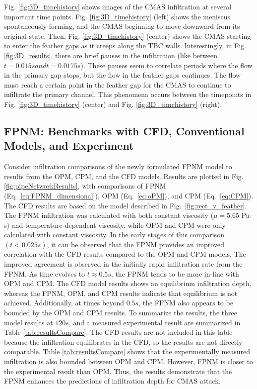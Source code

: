 \documentclass{UCF_ETD}
\begin{document}
Fig. \ref{fig:3D_timehistory} shows images of the CMAS infiltration at several important time points. Fig. \ref{fig:3D_timehistory} (left) shows the meniscus spontaneously forming, and the CMAS beginning to move downward from its original state. Then, Fig. \ref{fig:3D_timehistory} (center) shows the CMAS starting to enter the feather gaps as it creeps along the TBC walls. Interestingly, in Fig. \ref{fig:3D_results}, there are brief pauses in the infiltration (like between $t=0.015 s and t=0.0175 s$). These pauses seem to correlate periods where the flow in the primary gap stops, but the flow in the feather gaps continues. The flow must reach a certain point in the feather gap for the CMAS to continue to infiltrate the primary channel. This phenomena occurs between the timepoints in Fig. \ref{fig:3D_timehistory} (center) and Fig. \ref{fig:3D_timehistory} (right).

\subsection{FPNM: Benchmarks with CFD, Conventional Models, and Experiment}
Consider infiltration comparisons of the newly formulated FPNM model to results from the OPM, CPM, and the CFD models. 
Results are plotted in Fig. \ref{fig:pipeNetworkResults}, with comparisons of FPNM (Eq.~\ref{eq:FPNM_dimensional}), OPM (Eq.~\ref{eq:oPM}), and CPM (Eq.~\ref{eq:CPM}). The CFD results are based on the model described in Fig.~\ref{fig:rect_v_feather}. 
The FPNM infiltration was calculated with both constant viscosity ($\mu = 5.65$ Pa$\cdot$s) and temperature-dependent viscosity, while OPM and CPM were only calculated with constant viscosity.
In the early stages of this comparison $(t<0.025s)$, it can be observed that the FPNM provides an improved correlation with the CFD results compared to the OPM and CPM models. The improved agreement is observed in the initially rapid infiltration rate from the FPNM. 
As time evolves to $t\approx0.5s$, the FPNM tends to be more in-line with OPM and CPM. The CFD model results shows an equilibrium infiltration depth, whereas the FPNM, OPM, and CPM results indicate that equilibrium is not achieved. 
Additionally, at times beyond $0.5s$, the FPNM also appears to be bounded by the OPM and CPM results. 
To summarize the results, the three model results at $120 s$, and a measured experimental result are summarized in Table \ref{tab:resultsCompare}. The CFD results are not included in this table because the infiltration equilibrates in the CFD, so the results are not directly comparable.
Table \ref{tab:resultsCompare} shows that the experimentally measured infiltration is also bounded between OPM and CPM.
However, FPNM is closer to the experimental result than OPM. 
Thus, the results demonstrate that the FPNM enhances the predictions of infiltration depth for CMAS attack.
\end{document}
